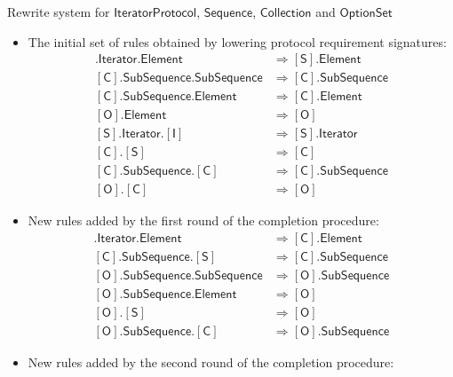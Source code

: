 \documentclass[headsepline,bibliography=totoc]{scrreport}
\newcommand{\namesym}[1]{\mathsf{#1}}
\newcommand{\proto}[1]{\bm{\mathsf{#1}}}
\newcommand{\protosym}[1]{[\proto{#1}]}
\theoremstyle{definition}
\theoremstyle{definition}
\theoremstyle{definition}
\begin{document}
\begin{listing}\caption{Rewrite system for $\proto{IteratorProtocol}$, $\proto{Sequence}$, $\proto{Collection}$ and $\proto{OptionSet}$}\label{rewritesystemcompleted}
\begin{itemize}
\item The initial set of rules obtained by lowering protocol requirement signatures:
\begin{align}
\protosym{S}.\namesym{Iterator}.\namesym{Element}&\Rightarrow\protosym{S}.\namesym{Element}\tag{1}\\
\protosym{C}.\namesym{SubSequence}.\namesym{SubSequence}&\Rightarrow\protosym{C}.\namesym{SubSequence}\tag{2}\\
\protosym{C}.\namesym{SubSequence}.\namesym{Element}&\Rightarrow\protosym{C}.\namesym{Element}\tag{3}\\
\protosym{O}.\namesym{Element}&\Rightarrow\protosym{O}\tag{4}\\
\protosym{S}.\namesym{Iterator}.\protosym{I}&\Rightarrow\protosym{S}.\namesym{Iterator}\tag{5}\\
\protosym{C}.\protosym{S}&\Rightarrow\protosym{C}\tag{6}\\
\protosym{C}.\namesym{SubSequence}.\protosym{C}&\Rightarrow\protosym{C}.\namesym{SubSequence}\tag{7}\\
\protosym{O}.\protosym{C}&\Rightarrow\protosym{O}\tag{8}
\end{align}
\item New rules added by the first round of the completion procedure:
\begin{align}
\protosym{C}.\namesym{Iterator}.\namesym{Element}&\Rightarrow\protosym{C}.\namesym{Element}\tag{9}\\
\protosym{C}.\namesym{SubSequence}.\protosym{S}&\Rightarrow\protosym{C}.\namesym{SubSequence}\tag{10}\\
\protosym{O}.\namesym{SubSequence}.\namesym{SubSequence}&\Rightarrow\protosym{O}.\namesym{SubSequence}\tag{11}\\
\protosym{O}.\namesym{SubSequence}.\namesym{Element}&\Rightarrow\protosym{O}\tag{12}\\
\protosym{O}.\protosym{S}&\Rightarrow\protosym{O}\tag{13}\\
\protosym{O}.\namesym{SubSequence}.\protosym{C}&\Rightarrow\protosym{O}.\namesym{SubSequence}\tag{14}
\end{align}
\item New rules added by the second round of the completion procedure:
\begin{align}

\end{align}
\end{itemize}
\end{listing}
\end{document}
